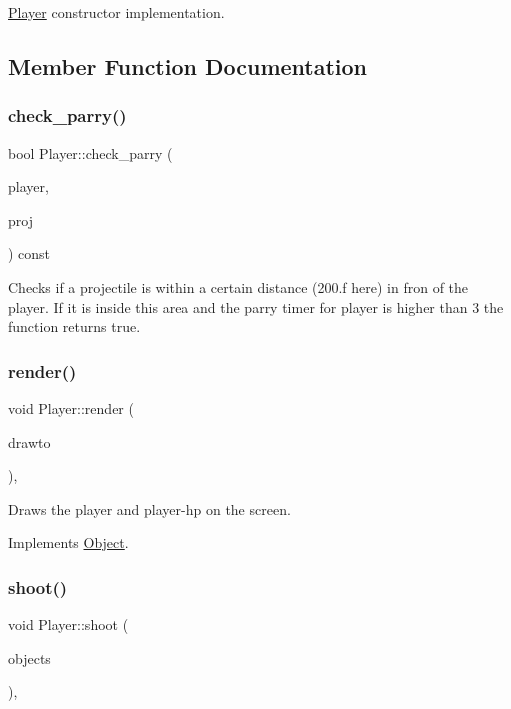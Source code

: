\hyperlink{classPlayer}{Player} constructor implementation. 

\subsection{Member Function Documentation}
\mbox{\label{classPlayer_a67a9e13790be1571986474106051dbe7}} 
\subsubsection{\texorpdfstring{check\+\_\+parry()}{check\_parry()}}
{\footnotesize\ttfamily bool Player\+::check\+\_\+parry (\begin{DoxyParamCaption}\item[{\hyperlink{classObject}{Object} $\ast$}]{player,  }\item[{\hyperlink{classProjectile}{Projectile} $\ast$}]{proj }\end{DoxyParamCaption}) const}

Checks if a projectile is within a certain distance (200.\+f here) in fron of the player. If it is inside this area and the parry timer for player is higher than 3 the function returns true. \mbox{\label{classPlayer_a320917a017d1d621b7413585ab017f14}} 
\subsubsection{\texorpdfstring{render()}{render()}}
{\footnotesize\ttfamily void Player\+::render (\begin{DoxyParamCaption}\item[{sf\+::\+Render\+Window \&}]{drawto }\end{DoxyParamCaption})\hspace{0.3cm}{\ttfamily [override]}, {\ttfamily [virtual]}}

Draws the player and player-\/hp on the screen. 

Implements \hyperlink{classObject}{Object}.

\mbox{\label{classPlayer_ac5b2ef483a7f16279891263b4888e1b8}} 
\subsubsection{\texorpdfstring{shoot()}{shoot()}}
{\footnotesize\ttfamily void Player\+::shoot (\begin{DoxyParamCaption}\item[{std\+::vector$<$ \hyperlink{classObject}{Object} $\ast$$>$ \&}]{objects }\end{DoxyParamCaption})\hspace{0.3cm}{\ttfamily [override]}, {\ttfamily [virtual]}}


